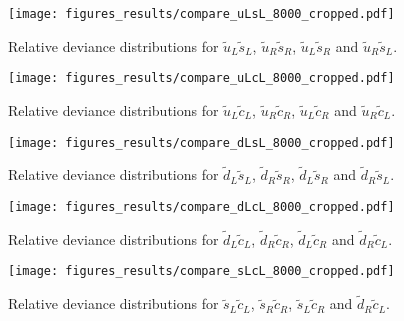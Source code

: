 \documentclass[twoside,english]{uiofysmaster}
\begin{document}
\begin{appendices}
\begin{figure}
\centering
\texttt{[image: figures\_results/compare\_uLsL\_8000\_cropped.pdf]}
\caption{Relative deviance distributions for $\tilde{u}_L \tilde{s}_L$, $\tilde{u}_R \tilde{s}_R$, $\tilde{u}_L \tilde{s}_R$ and $\tilde{u}_R \tilde{s}_L$.}
\end{figure}

\begin{figure}
\centering
\texttt{[image: figures\_results/compare\_uLcL\_8000\_cropped.pdf]}
\caption{Relative deviance distributions for $\tilde{u}_L \tilde{c}_L$, $\tilde{u}_R \tilde{c}_R$, $\tilde{u}_L \tilde{c}_R$ and $\tilde{u}_R \tilde{c}_L$.}
\end{figure}

\begin{figure}
\centering
\texttt{[image: figures\_results/compare\_dLsL\_8000\_cropped.pdf]}
\caption{Relative deviance distributions for $\tilde{d}_L \tilde{s}_L$, $\tilde{d}_R \tilde{s}_R$, $\tilde{d}_L \tilde{s}_R$ and $\tilde{d}_R \tilde{s}_L$.}
\end{figure}

\begin{figure}
\centering
\texttt{[image: figures\_results/compare\_dLcL\_8000\_cropped.pdf]}
\caption{Relative deviance distributions for $\tilde{d}_L \tilde{c}_L$, $\tilde{d}_R \tilde{c}_R$, $\tilde{d}_L \tilde{c}_R$ and $\tilde{d}_R \tilde{c}_L$.}
\end{figure}

\begin{figure}
\centering
\texttt{[image: figures\_results/compare\_sLcL\_8000\_cropped.pdf]}
\caption{Relative deviance distributions for $\tilde{s}_L \tilde{c}_L$, $\tilde{s}_R \tilde{c}_R$, $\tilde{s}_L \tilde{c}_R$ and $\tilde{d}_R \tilde{c}_L$.}
\end{figure}


\end{appendices}



\end{document}
